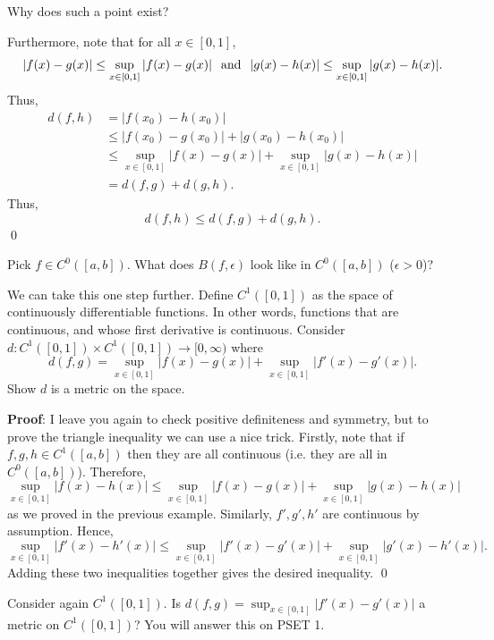 \begin{remark}
Why does such a point exist?
\end{remark}

Furthermore, note that for all $x\in [0,1]$, \[|f(x) - g(x)| \leq  \sup_{x\in [0,1]} |f(x) - g(x) |\hspace{.25cm} \text{and} \hspace{.25cm} |g(x) - h(x)| \leq  \sup_{x\in [0,1]} |g(x) - h(x) |.\] Thus,
\begin{align*}
    d(f,h) &= |f(x_0) - h(x_0)| \\
    &\leq |f(x_0) - g(x_0)| + |g(x_0) - h(x_0)| \\
    &\leq \sup_{x\in [0,1]} |f(x) - g(x) | + \sup_{x\in [0,1]} |g(x) - h(x) | \\
    &= d(f,g) + d(g,h).
\end{align*}
Thus, \[d(f,h) \leq d(f,g) + d(g,h).\]
\qed 

\begin{question}
Pick $f\in C^0([a,b])$. What does $B(f,\epsilon)$ look like in $C^0([a,b])$ ($\epsilon >0$)?
\end{question}

\begin{example}
We can take this one step further. Define $C^1([0,1])$ as the space of continuously differentiable functions. In other words, functions that are continuous, and whose first derivative is continuous. Consider \\
$d: C^1([0,1]) \times C^1([0,1]) \to [0,\infty)$ where
\[
d(f,g) = \sup_{x\in [0,1]} |f(x) - g(x)| + \sup_{x\in [0,1]} |f'(x) - g'(x)|.
\]
Show $d$ is a metric on the space.
\end{example}
\textbf{Proof}: I leave you again to check positive definiteness and symmetry, but to prove the triangle inequality we can use a nice trick. Firstly, note that if $f,g,h \in C^1([a,b])$ then they are all continuous (i.e. they are all in $C^0([a,b])$). Therefore, 
\[
\sup_{x\in [0,1]} |f(x)-h(x)| \leq \sup_{x\in [0,1]} |f(x) - g(x)| + \sup_{x\in [0,1]} |g(x) - h(x)|
\]
as we proved in the previous example. Similarly, $f',g',h'$ are continuous by assumption. Hence, 
\[
\sup_{x\in [0,1]} |f'(x)-h'(x)| \leq \sup_{x\in [0,1]} |f'(x) - g'(x)| + \sup_{x\in [0,1]} |g'(x) - h'(x)|.
\]
Adding these two inequalities together gives the desired inequality. \qed 

\begin{question}
Consider again $C^1([0,1])$. Is $d(f,g) = \sup_{x\in [0,1]} |f'(x) - g'(x)|$ a metric on $C^1([0,1])$? You will answer this on PSET 1.
\end{question}

